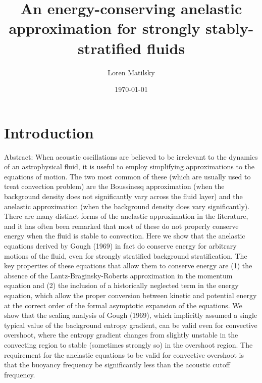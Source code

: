 \documentclass[12pt]{article}
\date{\today}
\author{Loren Matilsky}
\title{An energy-conserving anelastic approximation for strongly stably-stratified fluids}
\begin{document}
	\maketitle
	\section{Introduction}
	Abstract: When acoustic oscillations are believed to be irrelevant to the dynamics of an astrophysical fluid, it is useful to employ simplifying approximations to the equations of motion. The two most common of these (which are usually used to treat convection problem) are the Boussinesq approximation (when the background density does not significantly vary across the fluid layer) and the anelastic approximation (when the background density does vary significantly). There are many distinct forms of the anelastic approximation in the literature, and it has often been remarked that most of these do not properly conserve energy when the fluid is stable to convection. Here we show that the anelastic equations derived by Gough (1969) in fact do conserve energy for arbitrary motions of the fluid, even for strongly stratified background stratification. The key properties of these equations that allow them to conserve energy are (1) the absence of the Lantz-Braginsky-Roberts approximation in the momentum equation and (2) the inclusion of a historically neglected term in the energy equation, which allow the proper conversion between kinetic and potential energy at the correct order of the formal asymptotic expansion of the equations. We show that the scaling analysis of Gough (1969), which implicitly assumed a single typical value of the background entropy gradient, can be valid even for convective overshoot, where the entropy gradient changes from slightly unstable in the convecting region to stable (sometimes strongly so) in the overshoot region. The requirement for the anelastic equations to be valid for convective overshoot is that the buoyancy frequency be significantly less than the acoustic cutoff frequency. 
	
\end{document}
